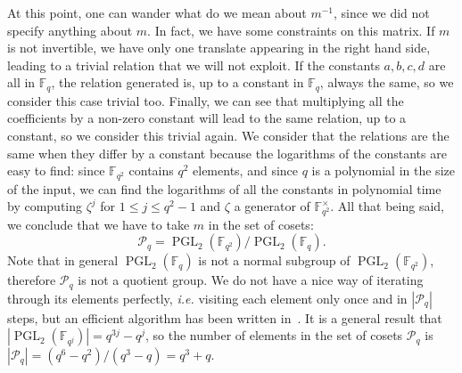 \documentclass[a4paper,11pt]{article}
\theoremstyle{break}
\theoremstyle{sc}
\theoremstyle{definition}
\theoremstyle{remark}
\DeclareMathOperator{\pgl}{PGL}
\newcommand{\ie}{\emph{i.e. }}
\begin{document}
At this point, one can wander what do we mean about $m^{-1}$, since we
did not specify anything about $m$. In fact, we have some constraints on this
matrix. If $m$ is not invertible, we have only one translate appearing in the
right hand side, leading to a trivial relation that we will not exploit. If the
constants $a, b, c, d$ are all in $\mathbb{F}_q$, the relation generated is, up
to a constant in $\mathbb{F}_q$, always the same, so we consider this case
trivial too. Finally, we can see that multiplying all the coefficients by a
non-zero constant will lead to the same relation, up to a constant, so we
consider this trivial again. We consider that the relations are the same when
they differ by a constant because the logarithms of the constants are easy to
find: since $\mathbb{F}_{q^2}$ contains $q^2$ elements, and since $q$ is a
polynomial in the size of the input, we can find the logarithms of all the
constants in polynomial time by computing $\zeta^j$ for $1\leq j \leq q^2-1$ and
$\zeta$ a generator of $\mathbb{F}_{q^2}^\times$. All that being said, we conclude that we have to take
$m$ in the set of cosets:
\[
  \mathcal P_q = \pgl_2(\mathbb{F}_{q^2})/\pgl_2(\mathbb{F}_q).
\]
Note that in general $\pgl_2(\mathbb{F}_q)$ is not a normal subgroup of
$\pgl_2(\mathbb{F}_{q^2})$, therefore $\mathcal P_q$ is not a quotient group.
We do not have a nice way of iterating
through its elements perfectly, \ie visiting each element only once and in
$|\mathcal P_q|$ steps, but an efficient algorithm has been written
in~\cite{ZC15}. It is a general result that
$|\pgl_2(\mathbb{F}_{q^j})|=q^{3j}-q^j$, so the number of elements in the set of
cosets $\mathcal P_q$ is $|\mathcal P_q| = (q^6-q^2)/(q^3-q)=q^3+q$.
\end{document}
